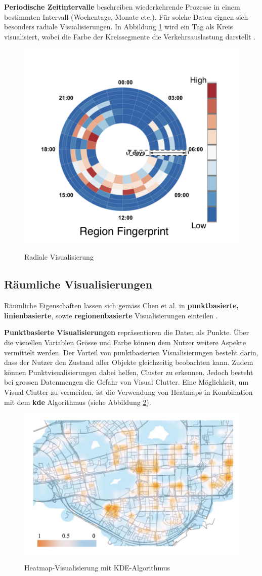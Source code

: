 \textbf{Periodische Zeitintervalle} beschreiben wiederkehrende Prozesse in einem bestimmten Intervall (Wochentage, Monate etc.). Für solche Daten eignen sich besonders radiale Visualisierungen. In Abbildung \ref{fig_radial_layout} wird ein Tag als Kreis visualisiert, wobei die Farbe der Kreissegmente die Verkehrsauslastung darstellt \parencite[S. 2973 - 2974]{survey_traffic_data_visualization_2015}.

\begin{figure}[H]
    \caption{Radiale Visualisierung \parencite[S. 5]{radial_layout_t_watcher}}
    \includegraphics[width=.5\linewidth]{content/00_assets/radial_layout.png}
    \label{fig_radial_layout}
\end{figure}

\subsection{Räumliche Visualisierungen}
Räumliche Eigenschaften lassen sich gemäss Chen et al. in \textbf{punktbasierte, linienbasierte}, sowie \textbf{regionenbasierte} Visualisierungen einteilen \parencite[S. 2974 - 2975]{survey_traffic_data_visualization_2015}.

\textbf{Punktbasierte Visualisierungen} repräsentieren die Daten als Punkte. Über die visuellen Variablen Grösse und Farbe können dem Nutzer weitere Aspekte vermittelt werden. Der Vorteil von punktbasierten Visualisierungen besteht darin, dass der Nutzer den Zustand aller Objekte gleichzeitig beobachten kann. Zudem können Punktvisualisierungen dabei helfen, Cluster zu erkennen. Jedoch besteht bei grossen Datenmengen die Gefahr von Visual Clutter. Eine Möglichkeit, um Visual Clutter zu vermeiden, ist die Verwendung von Heatmaps in Kombination mit dem \textbf{\acrfull{kde}} Algorithmus (siehe Abbildung \ref{fig_heatmap_kde}).

\begin{figure}[H]
    \caption{Heatmap-Visualisierung mit KDE-Algorithmus \parencite{vait_system}}
    \includegraphics[width=.5\linewidth]{content/00_assets/heatmap_kde.png}
    \label{fig_heatmap_kde}
\end{figure}

